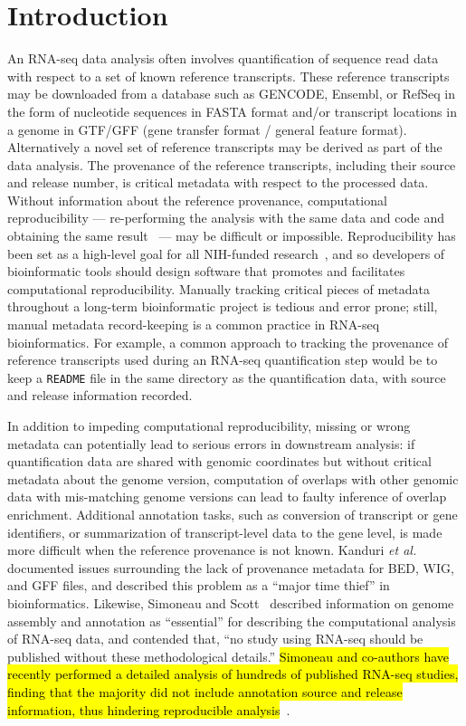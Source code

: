 \section*{Introduction}

An RNA-seq data analysis often involves quantification of sequence
read data with respect to a set of known reference transcripts. These
reference transcripts may be downloaded from a database such as
GENCODE, Ensembl, or RefSeq \cite{gencode,ensembl,refseq} in the form
of nucleotide sequences in FASTA format and/or transcript locations in a genome in
GTF/GFF (gene transfer format / general feature format). Alternatively
a novel set of reference transcripts may be derived as part of the data analysis. The
provenance of the reference transcripts, including their source and release
number, is critical metadata with respect to the processed data. Without
information about the reference provenance, computational
reproducibility --- re-performing the analysis with the same data and
code and obtaining the same result~\cite{Patil2016} --- 
may be difficult or impossible. Reproducibility has been set as a
high-level goal for all NIH-funded research~\cite{collins2014,lauer2017}, 
and so developers of bioinformatic tools should design software
that promotes and facilitates computational reproducibility.
Manually tracking
critical pieces of metadata throughout a long-term bioinformatic
project is tedious and error prone; still, manual metadata record-keeping is
a common practice in RNA-seq bioinformatics. For example, a common
approach to tracking the provenance of reference transcripts used during
an RNA-seq quantification step would be to keep a \texttt{README} file
in the same directory as the quantification data, with source and
release information recorded.

In addition to impeding computational reproducibility, missing or
wrong metadata can potentially lead to serious errors in downstream
analysis: if quantification data are shared with genomic coordinates
but without critical metadata about the genome version, computation of
overlaps with other genomic data with mis-matching genome versions can
lead to faulty inference of overlap enrichment. Additional annotation
tasks, such as conversion of transcript or gene identifiers, or
summarization of transcript-level data to the gene level, is made more difficult
when the reference provenance is not known. Kanduri \textit{et al.}~\cite{Kanduri2017}
documented issues surrounding the lack of provenance metadata for BED,
WIG, and GFF files, and described this problem as a ``major time
thief'' in bioinformatics. Likewise, Simoneau and
Scott~\cite{Simoneau2019} described 
information on genome assembly and annotation as ``essential'' for
describing the computational analysis of RNA-seq data, and contended
that, ``no study using RNA-seq should be published without these
methodological details.'' \hl{Simoneau and co-authors have recently
performed a detailed analysis of hundreds of published RNA-seq studies,
finding that the majority did not include annotation source and release
information, thus hindering reproducible analysis}~\cite{Simoneau2019BIB}.

